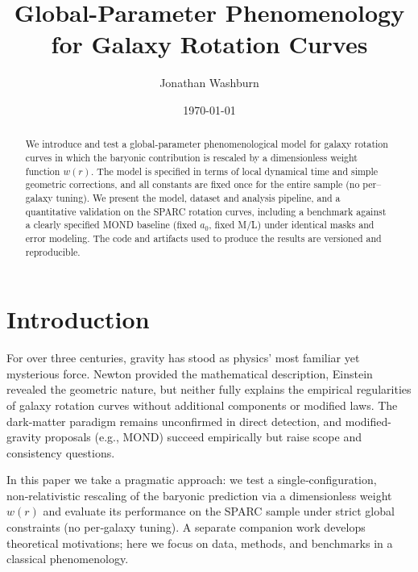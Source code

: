 \documentclass[twocolumn,prd,amsmath,amssymb,aps,superscriptaddress,nofootinbib]{revtex4-2}
\begin{document}
\title{Global-Parameter Phenomenology for Galaxy Rotation Curves}

\author{Jonathan Washburn}

\date{\today}

\begin{abstract}
\noindent
We introduce and test a global-parameter phenomenological model for galaxy rotation curves in which the baryonic contribution is rescaled by a dimensionless weight function $w(r)$. The model is specified in terms of local dynamical time and simple geometric corrections, and all constants are fixed once for the entire sample (no per–galaxy tuning). We present the model, dataset and analysis pipeline, and a quantitative validation on the SPARC rotation curves, including a benchmark against a clearly specified MOND baseline (fixed $a_0$, fixed M/L) under identical masks and error modeling. The code and artifacts used to produce the results are versioned and reproducible.
\end{abstract}

\maketitle

\section{Introduction}

For over three centuries, gravity has stood as physics' most familiar yet mysterious force. Newton provided the mathematical description, Einstein revealed the geometric nature, but neither fully explains the empirical regularities of galaxy rotation curves without additional components or modified laws. The dark-matter paradigm remains unconfirmed in direct detection, and modified-gravity proposals (e.g., MOND) succeed empirically but raise scope and consistency questions.

In this paper we take a pragmatic approach: we test a single‑configuration, non‑relativistic rescaling of the baryonic prediction via a dimensionless weight $w(r)$ and evaluate its performance on the SPARC sample under strict global constraints (no per‑galaxy tuning). A separate companion work develops theoretical motivations; here we focus on data, methods, and benchmarks in a classical phenomenology.
\end{document}
